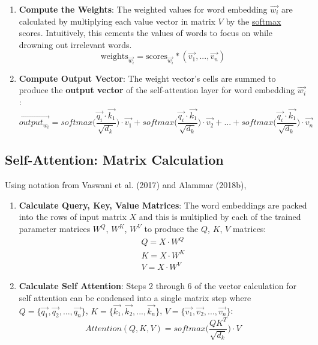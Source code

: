 \begin{enumerate}
    \item \textbf{Compute the Weights}: The weighted values for word embedding $\overrightarrow{w_i}$ are calculated by multiplying each value vector in matrix $V$ by the \hyperref[cnc:softmaxLayer]{softmax} scores. Intuitively, this cements the values of words to focus on while drowning out irrelevant words. 
    $$
    \text{weights}_{\overrightarrow{w_i}} = \text{scores}_{\overrightarrow{w_i}} * (\overrightarrow{v_1}, ..., \overrightarrow{v_n})
    $$

    \item \textbf{Compute Output Vector}: The weight vector's cells are summed to produce the \textbf{output vector} of the self-attention layer for word embedding $\overrightarrow{w_i}$: 
    $$
    \overrightarrow{output_{w_i}} = softmax \Bigg(
    \frac {\overrightarrow{q_i} \cdot \overrightarrow{k_1}} {\sqrt{d_k}} \Bigg) \cdot \overrightarrow{v_1} +
    softmax \Bigg(\frac {\overrightarrow{q_i} \cdot \overrightarrow{k_1}} {\sqrt{d_k}} \Bigg) \cdot \overrightarrow{v_2} + ... +
    softmax \Bigg(\frac {\overrightarrow{q_i} \cdot \overrightarrow{k_1}} {\sqrt{d_k}} \Bigg) \cdot \overrightarrow{v_n}
    $$
\end{enumerate} 


\subsection{Self-Attention: Matrix Calculation}

Using notation from Vaswani et al. (2017) and Alammar (2018b), 

\begin{enumerate}
    \item \textbf{Calculate Query, Key, Value Matrices}: The word embeddings are packed into the rows of input matrix $X$ and this is multiplied by each of the trained parameter matrices $W^Q$, $W^K$, $W^V$ to produce the $Q$, $K$, $V$ matrices:
    $$
    \begin{array}{ll}
    Q = X \cdot W^Q \\
    K = X \cdot W^K \\
    V = X \cdot W^V 
    \end{array}
    $$
    
    \item \textbf{Calculate Self Attention}: Steps 2 through 6 of the vector calculation for self attention can be condensed into a single matrix step where $Q = \Big\{\overrightarrow{q_1}, \overrightarrow{q_2}, ..., \overrightarrow{q_n} \Big\}$, $K = \Big\{\overrightarrow{k_1}, \overrightarrow{k_2}, ..., \overrightarrow{k_n} \Big\}$, $V = \Big\{\overrightarrow{v_1}, \overrightarrow{v_2}, ..., \overrightarrow{v_n} \Big\}$: 
    $$
    Attention(Q, K, V) = softmax \Bigg(\frac {QK^T} {\sqrt{d_k}} \Bigg) \cdot V
    $$
\end{enumerate}


